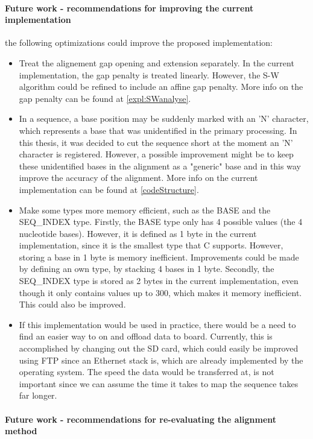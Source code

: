 \paragraph{Future work - recommendations for improving the current implementation}

the following optimizations could improve the proposed implementation:

\begin{itemize}
	\item Treat the alignement gap opening and extension separately. In the current implementation, the gap penalty is treated linearly. However, the S-W algorithm could be refined to include an affine gap penalty. More info on the gap penalty can be found at \ref{expl:SWanalyse}.
	\item In a sequence, a base position may be suddenly marked with an 'N' character, which represents a base that was unidentified in the primary processing. In this thesis, it was decided to cut the sequence short at the moment an 'N' character is registered. However, a possible improvement might be to keep these unidentified bases in the alignment as a "generic" base and in this way improve the accuracy of the alignment. More info on the current implementation can be found at \ref{codeStructure}.
	\item Make some types more memory efficient, such as the BASE and the SEQ\_INDEX type. Firstly, the BASE type only has 4 possible values (the 4 nucleotide bases). However, it is defined as 1 byte in the current implementation, since it is the smallest type that C supports. However, storing a base in 1 byte is memory inefficient. Improvements could be made by defining an own type, by stacking 4 bases in 1 byte. Secondly, the SEQ\_INDEX type is stored as 2 bytes in the current implementation, even though it only contains values up to 300, which makes it memory inefficient. This could also be improved.
	\item If this implementation would be used in practice, there would be a need to find an easier way to on and offload data to board. Currently,  this is accomplished by changing out the SD card, which could easily be improved using FTP since an Ethernet stack is, which are already implemented by the operating system. The speed the data would be transferred at, is not important since we can assume the time it takes to map the sequence takes far longer. 
\end{itemize}

\paragraph{Future work - recommendations for re-evaluating the alignment method}

